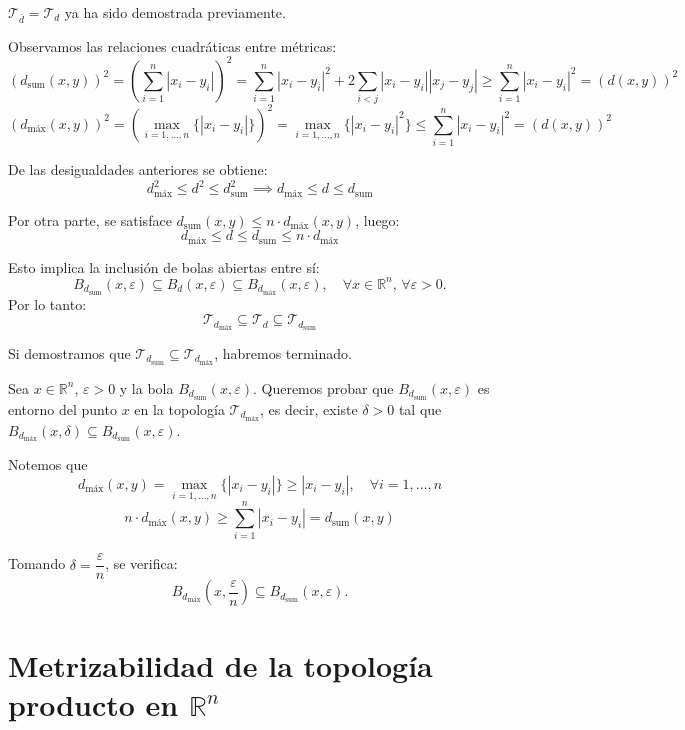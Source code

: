 \begin{dem}
$\mathcal{T}_{\overline{d}} = \mathcal{T}_d$ ya ha sido demostrada previamente.

Observamos las relaciones cuadráticas entre métricas:
\[
\left(d_{\text{sum}}(x,y)\right)^2 = \left(\sum_{i=1}^n |x_i - y_i|\right)^2 = \sum_{i=1}^n |x_i - y_i|^2 + 2\sum_{i < j} |x_i - y_i||x_j - y_j| \ge \sum_{i=1}^n |x_i - y_i|^2 = (d(x,y))^2
\]
\[
\left(d_{\text{máx}}(x,y)\right)^2 = \left(\max_{i=1,\dots,n} \{|x_i - y_i|\}\right)^2 = \max_{i=1,\dots,n} \{|x_i - y_i|^2\} \le \sum_{i=1}^n |x_i - y_i|^2 = (d(x,y))^2
\]

De las desigualdades anteriores se obtiene:
\[
d_{\text{máx}}^2 \le d^2 \le d_{\text{sum}}^2 \implies d_{\text{máx}} \le d \le d_{\text{sum}}
\]

Por otra parte, se satisface $d_{\text{sum}}(x,y) \le n \cdot d_{\text{máx}}(x,y)$, luego:
\[
d_{\text{máx}} \le d \le d_{\text{sum}} \le n \cdot d_{\text{máx}}
\]

Esto implica la inclusión de bolas abiertas entre sí:
\[
B_{d_{\text{sum}}}(x, \varepsilon) \subseteq B_d(x, \varepsilon) \subseteq B_{d_{\text{máx}}}(x, \varepsilon), \quad \forall x \in \mathbb{R}^n, \, \forall \varepsilon > 0.
\]
Por lo tanto:
\[
\mathcal{T}_{d_{\text{máx}}} \subseteq \mathcal{T}_d \subseteq \mathcal{T}_{d_{\text{sum}}}
\]

Si demostramos que $\mathcal{T}_{d_{\text{sum}}} \subseteq \mathcal{T}_{d_{\text{máx}}}$, habremos terminado.

Sea $x \in \mathbb{R}^n$, $\varepsilon > 0$ y la bola $B_{d_{\text{sum}}}(x, \varepsilon)$. Queremos probar que $B_{d_{\text{sum}}}(x, \varepsilon)$ es entorno del punto $x$ en la topología $\mathcal{T}_{d_{\text{máx}}}$, es decir, existe $\delta > 0$ tal que $B_{d_{\text{máx}}}(x, \delta) \subseteq B_{d_{\text{sum}}}(x, \varepsilon)$.

Notemos que
\[
d_{\text{máx}}(x,y) = \max_{i=1,\dots,n} \{|x_i - y_i|\} \ge |x_i - y_i|, \quad \forall i=1,\dots,n
\]
\[
n \cdot d_{\text{máx}}(x,y) \ge \sum_{i=1}^n |x_i - y_i| = d_{\text{sum}}(x,y)
\]

Tomando $\delta = \dfrac{\varepsilon}{n}$, se verifica:
\[
B_{d_{\text{máx}}}\left(x, \frac{\varepsilon}{n}\right) \subseteq B_{d_{\text{sum}}}(x, \varepsilon). 
\]
\end{dem}

\section{Metrizabilidad de la topología producto en $\mathbb{R}^n$}


